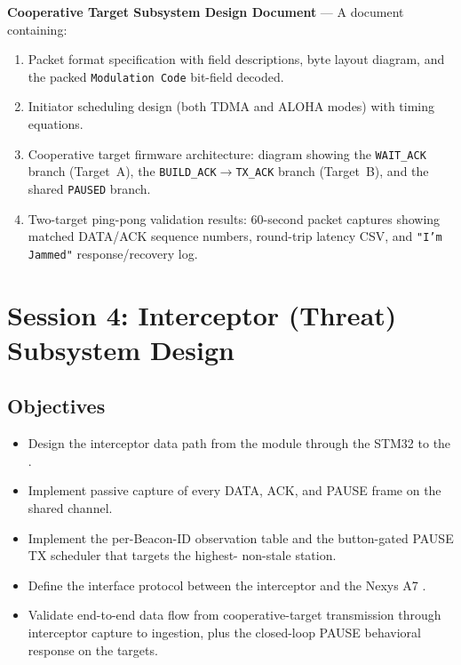\documentclass[11pt,letterpaper]{article}
\begin{document}
	\begin{tcolorbox}[deliverable={Session 3 Deliverable}]
		\textbf{Cooperative Target Subsystem Design Document} --- A document containing:
		\begin{enumerate}
			\item Packet format specification with field descriptions, byte layout diagram, and the packed \texttt{Modulation Code} bit-field decoded.
			\item Initiator scheduling design (both TDMA and ALOHA modes) with timing equations.
			\item Cooperative target firmware architecture: \FSM{} diagram showing the \texttt{WAIT\_ACK} branch (Target~A), the \texttt{BUILD\_ACK}$\to$\texttt{TX\_ACK} branch (Target~B), and the shared \texttt{PAUSED} branch.
			\item Two-target ping-pong validation results: 60-second packet captures showing matched DATA/ACK sequence numbers, round-trip latency CSV, and \texttt{"I'm Jammed"} response/recovery log.
		\end{enumerate}
	\end{tcolorbox}

	\newpage
	\section{Session 4: Interceptor (Threat) Subsystem Design}
	\label{sec:receiver}

	\subsection{Objectives}

	\begin{itemize}[leftmargin=2em]
		\item Design the interceptor data path from the \RF{} module through the STM32 to the \FPGA{}.
		\item Implement passive capture of every DATA, ACK, and PAUSE frame on the shared channel.
		\item Implement the per-Beacon-ID \RSSI{} observation table and the button-gated PAUSE TX scheduler that targets the highest-\RSSI{} non-stale station.
		\item Define the interface protocol between the interceptor \MCU{} and the Nexys A7 \FPGA{}.
		\item Validate end-to-end data flow from cooperative-target transmission through interceptor capture to \FPGA{} ingestion, plus the closed-loop PAUSE behavioral response on the targets.
	\end{itemize}
\end{document}
